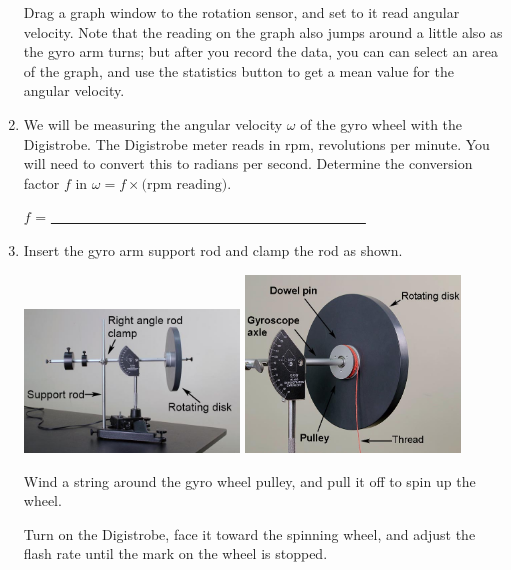 \begin{enumerate}[label=\arabic*.]
Drag a graph window to the rotation sensor, and set to it read angular velocity.  Note that the reading on the graph also jumps around a little also as the gyro arm turns; but after you record the data, you can can select an area of the graph, and use the statistics button to get a mean value for the angular velocity.

\item We will be measuring the angular velocity \(\omega\) of the gyro wheel with the Digistrobe.  The Digistrobe meter reads in rpm, revolutions per minute.  You will need to convert this to radians per second.  Determine the conversion factor \(f\) in \(\omega = f\times\textrm{(rpm reading)}\).

\(f\) = \ul{~~~~~~~~~~~~~~~~~~~~~~~~~~~~~~~~~~~~~~~~~~~~~}

\item Insert the gyro arm support rod and clamp the rod as shown.
\begin{center} \includegraphics*[width=0.45\textwidth]{imgs/6labs/6Alab/6Aexp7/6A-EXP-fig3_tex_fix_fi_pdf.jpg} \includegraphics*[width=0.45\textwidth]{imgs/6labs/6Alab/6Aexp7/IMG_5656_pdf.jpg} \end{center}
Wind a string around the gyro wheel pulley, and pull it off to spin up the wheel.

Turn on the Digistrobe, face it toward the spinning wheel, and adjust the flash rate until the mark on the wheel is stopped.


\end{enumerate}
